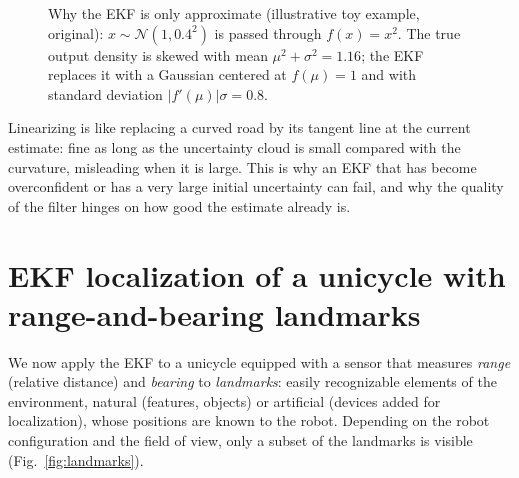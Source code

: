 \documentclass[11pt,a4paper]{article}
\newcommand{\slides}[1]{\texorpdfstring{\hspace{0.5em}{\normalfont\small\emph{(#1)}}}{}}
\theoremstyle{plain}
\theoremstyle{definition}
\theoremstyle{remark}
\begin{document}
\begin{figure}[H]
\centering
{}
\caption{Why the EKF is only approximate (illustrative toy example, original): $x\sim\mathcal N(1,0.4^2)$ is passed through $f(x)=x^2$.
The true output density is skewed with mean $\mu^2+\sigma^2=1.16$; the EKF replaces it with a Gaussian centered at $f(\mu)=1$ and with
standard deviation $|f'(\mu)|\sigma=0.8$.}\label{fig:ekfapprox}
\end{figure}

\begin{intuition}
Linearizing is like replacing a curved road by its tangent line at the current estimate: fine as long as the uncertainty
cloud is small compared with the curvature, misleading when it is large. This is why an EKF that has become overconfident or has a very
large initial uncertainty can fail, and why the quality of the filter hinges on how good the estimate already is.
\end{intuition}

\section{EKF localization of a unicycle with range-and-bearing landmarks \slides{book, Sect.\ 7.7.2}}

We now apply the EKF to a unicycle equipped with a sensor that measures \emph{range} (relative distance) and \emph{bearing} to
\emph{landmarks}: easily recognizable elements of the environment, natural (features, objects) or artificial (devices added for
localization), whose positions are known to the robot. Depending on the robot configuration and the field of view, only a subset of the
landmarks is visible (Fig.~\ref{fig:landmarks}).
\end{document}
